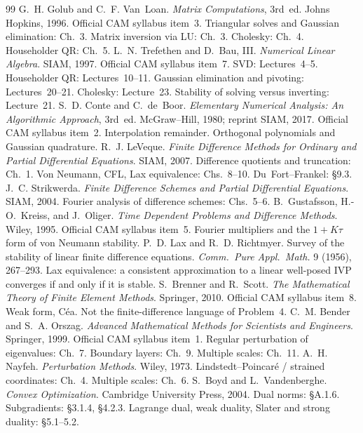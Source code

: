 \documentclass[11pt,a4paper]{article}
\begin{document}


\begin{thebibliography}{99}
G.~H. Golub and C.~F. Van~Loan.
\newblock \emph{Matrix Computations}, 3rd~ed.
\newblock Johns Hopkins, 1996.
\newblock Official CAM syllabus item~3. Triangular solves and Gaussian elimination: Ch.~3. Matrix inversion via LU: Ch.~3. Cholesky: Ch.~4. Householder QR: Ch.~5.
L.~N. Trefethen and D.~Bau, III.
\newblock \emph{Numerical Linear Algebra}.
\newblock SIAM, 1997.
\newblock Official CAM syllabus item~7. SVD: Lectures~4--5. Householder QR: Lectures~10--11. Gaussian elimination and pivoting: Lectures~20--21. Cholesky: Lecture~23. Stability of solving versus inverting: Lecture~21.
S.~D. Conte and C.~de~Boor.
\newblock \emph{Elementary Numerical Analysis: An Algorithmic Approach}, 3rd~ed.
\newblock McGraw--Hill, 1980; reprint SIAM, 2017.
\newblock Official CAM syllabus item~2. Interpolation remainder. Orthogonal polynomials and Gaussian quadrature.
R.~J. LeVeque.
\newblock \emph{Finite Difference Methods for Ordinary and Partial Differential Equations}.
\newblock SIAM, 2007.
\newblock Difference quotients and truncation: Ch.~1. Von Neumann, CFL, Lax equivalence: Chs.~8--10. Du~Fort--Frankel: \S9.3.
J.~C. Strikwerda.
\newblock \emph{Finite Difference Schemes and Partial Differential Equations}.
\newblock SIAM, 2004.
\newblock Fourier analysis of difference schemes: Chs.~5--6.
B.~Gustafsson, H.-O.~Kreiss, and J.~Oliger.
\newblock \emph{Time Dependent Problems and Difference Methods}.
\newblock Wiley, 1995.
\newblock Official CAM syllabus item~5. Fourier multipliers and the \(1+K\tau\) form of von Neumann stability.
P.~D. Lax and R.~D. Richtmyer.
\newblock Survey of the stability of linear finite difference equations.
\newblock \emph{Comm.\ Pure Appl.\ Math.} 9 (1956), 267--293.
\newblock Lax equivalence: a consistent approximation to a linear well-posed IVP converges if and only if it is stable.
S.~Brenner and R.~Scott.
\newblock \emph{The Mathematical Theory of Finite Element Methods}.
\newblock Springer, 2010.
\newblock Official CAM syllabus item~8. Weak form, C\'ea. Not the finite-difference language of Problem~4.
C.~M. Bender and S.~A. Orszag.
\newblock \emph{Advanced Mathematical Methods for Scientists and Engineers}.
\newblock Springer, 1999.
\newblock Official CAM syllabus item~1. Regular perturbation of eigenvalues: Ch.~7. Boundary layers: Ch.~9. Multiple scales: Ch.~11.
A.~H. Nayfeh.
\newblock \emph{Perturbation Methods}.
\newblock Wiley, 1973.
\newblock Lindstedt--Poincar\'e / strained coordinates: Ch.~4. Multiple scales: Ch.~6.
S.~Boyd and L.~Vandenberghe.
\newblock \emph{Convex Optimization}.
\newblock Cambridge University Press, 2004.
\newblock Dual norms: \S A.1.6. Subgradients: \S3.1.4, \S4.2.3. Lagrange dual, weak duality, Slater and strong duality: \S5.1--5.2.
\end{thebibliography}
\end{document}

